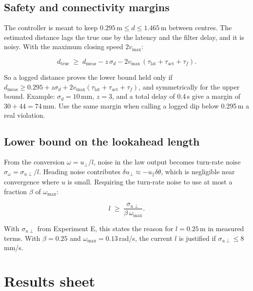 \documentclass[11pt,a4paper]{article}
\begin{document}
\subsection{Safety and connectivity margins}
The controller is meant to keep $0.295\,\text{m}\le d\le1.465\,\text{m}$
between centres. The estimated distance lags the true one by the latency
and the filter delay, and it is noisy. With the maximum closing speed
$2v_\text{max}$:
\begin{mathbox}
\begin{equation}
  d_\text{true}\;\ge\;d_\text{meas}-z\,\sigma_d-2v_\text{max}\,(\tau_\text{lat}+\tau_\text{act}+\tau_f).
\end{equation}
\end{mathbox}
So a logged distance proves the lower bound held only if
$d_\text{meas}\ge0.295+z\sigma_d+2v_\text{max}(\tau_\text{lat}+\tau_\text{act}+\tau_f)$,
and symmetrically for the upper bound. Example: $\sigma_d=10$\,mm, $z=3$,
and a total delay of 0.4\,s give a margin of $30+44=74$\,mm. Use the same
margin when calling a logged dip below 0.295\,m a real violation.

\subsection{Lower bound on the lookahead length}
From the conversion $\omega=u_\perp/l$, noise in the law output becomes
turn-rate noise $\sigma_\omega=\sigma_{u\perp}/l$. Heading noise
contributes $\delta u_\perp\approx-u_\parallel\delta\theta$, which is
negligible near convergence where $u$ is small. Requiring the turn-rate
noise to use at most a fraction $\beta$ of $\omega_\text{max}$:
\begin{mathbox}
\begin{equation}
  l\;\ge\;\frac{\sigma_{u\perp}}{\beta\,\omega_\text{max}} .
\end{equation}
\end{mathbox}
With $\sigma_{u\perp}$ from Experiment E, this states the reason for
$l=0.25$\,m in measured terms. With $\beta=0.25$ and $\omega_\text{max}=0.13$\,rad/s,
the current $l$ is justified if $\sigma_{u\perp}\le8$\,mm/s.

\section{Results sheet}
\end{document}
